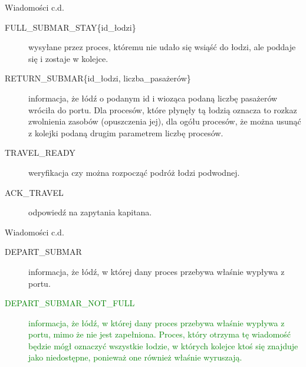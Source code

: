 \documentclass{beamer}
\begin{document}
\begin{frame}{Wiadomości c.d.}
    \internallinenumbers
    \resetlinenumber[1]
    \begin{description}
        \item [FULL\_SUBMAR\_STAY\{id\_łodzi\}] wysyłane przez proces, któremu nie udało się wsiąść do łodzi, ale poddaje się i zostaje w kolejce.
        \item [RETURN\_SUBMAR\{id\_łodzi, liczba\_pasażerów\}] informacja, że łódź o podanym id i wioząca podaną liczbę pasażerów wróciła do portu. Dla procesów, które płynęły tą łodzią oznacza to rozkaz zwolnienia zasobów (opuszczenia jej), dla ogółu procesów, że można usunąć z kolejki podaną drugim parametrem liczbę procesów.
        \item [TRAVEL\_READY] weryfikacja czy można rozpocząć podróż łodzi podwodnej.
        \item [ACK\_TRAVEL] odpowiedź na zapytania kapitana.
    \end{description}
\end{frame}

\begin{frame}{Wiadomości c.d.}
    \internallinenumbers
    \resetlinenumber[1]
    \begin{description}
        \item [DEPART\_SUBMAR] informacja, że łódź, w której dany proces przebywa właśnie wypływa z portu.
        \item [\textcolor{green}{DEPART\_SUBMAR\_NOT\_FULL}] \textcolor{green}{informacja, że łódź, w której dany proces przebywa właśnie wypływa z portu, mimo że nie jest zapełniona. Proces, który otrzyma tę wiadomość będzie mógł oznaczyć wszystkie łodzie, w których kolejce ktoś się znajduje jako niedostępne, ponieważ one również właśnie wyruszają.}
    \end{description}
\end{frame}
\end{document}
